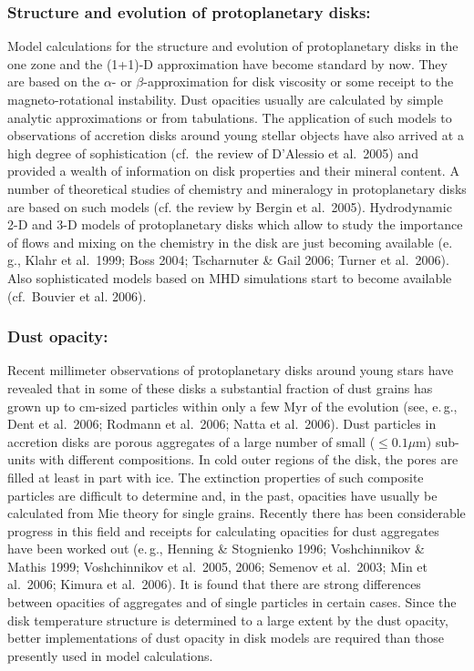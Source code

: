 \subsubsection{Structure and evolution of protoplanetary disks:} Model
calculations for the structure and evolution of protoplanetary
disks in the one zone and the (1+1)-D approximation have become
standard by now. They are based on the $\alpha$- or
$\beta$-approximation for disk viscosity or some receipt to the
magneto-rotational instability. Dust opacities usually are
calculated by simple analytic approximations or from tabulations.
The application of such models to observations of accretion disks
around young stellar objects have also arrived at a high degree of
sophistication (cf.\ the review of D'Alessio et al.~2005) and
provided a wealth of information on disk properties and their
mineral content.  A number of theoretical studies of chemistry and
mineralogy in protoplanetary disks are based on such models (cf.
the review by Bergin et al.~2005). Hydrodynamic 2-D and 3-D models
of protoplanetary disks which allow to study the importance of
flows and mixing on the chemistry in the disk are just becoming
available (e.\,g., Klahr et al.~1999; Boss 2004; Tscharnuter \&
Gail 2006; Turner et al.~2006). Also sophisticated models based on
MHD simulations start to become available (cf.\ Bouvier et al.
2006).

\subsubsection{Dust opacity:}
Recent millimeter observations of protoplanetary disks around
young stars have revealed that in some of these disks a
substantial fraction of dust grains has grown up to cm-sized
particles within only a few Myr of the evolution (see, e.\,g.,
Dent et al.~2006; Rodmann et al.~2006; Natta et al.~2006). Dust
particles in accretion disks are porous aggregates of a large
number of small ($\leq0.1\mu$m) sub-units with different
compositions. In cold outer regions of the disk, the pores are filled at least
in part with ice. The extinction properties of such composite
particles are difficult to determine and, in the past, opacities
have usually be calculated from Mie theory for single grains.
Recently there has been considerable progress in this field and
receipts for calculating opacities for dust aggregates have been
worked out (e.\,g., Henning \& Stognienko 1996; Voshchinnikov \&
Mathis 1999; Voshchinnikov et al.~2005, 2006; Semenov et al.~2003;
Min et al.~2006; Kimura et al.~2006). It is found that there are
strong differences between opacities of aggregates and of single
particles in certain cases. Since the disk temperature structure
is determined to a large extent by the dust opacity, better
implementations of dust opacity in disk models are required than
those presently used in model calculations.


